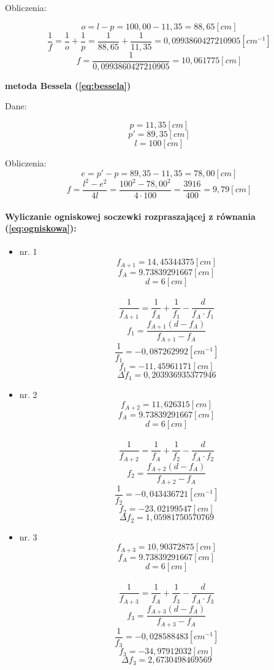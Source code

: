 \documentclass{article}
\begin{document}
Obliczenia:

\[o = l - p = 100,00 - 11,35 = 88,65[cm] \nonumber\]
\[\frac{1}{f} = \frac{1}{o}+\frac{1}{p} = \frac{1}{88,65} + \frac{1}{11,35} = 0,0993860427210905[cm^{-1}] \nonumber\]
\[f = \frac{1}{0,0993860427210905} = 10,061775 [cm] \nonumber\]

\textbf{metoda Bessela (\ref{eq:bessela})}

Dane: 

\[p = 11,35[cm]\nonumber\]
\[p' = 89,35[cm]\nonumber\]
\[l = 100[cm] \nonumber\]

Obliczenia: 
\[e = p' - p = 89,35 - 11,35 = 78,00[cm]\]
\[f = \frac{l^2-e^2}{4l} = \frac{100^2 - 78,00^2}{4 \cdot 100} = \frac{3916}{400} = 9,79[cm]\]

\paragraph{Wyliczanie ogniskowej soczewki rozpraszającej z równania (\ref{eq:ogniskowa}):}



\begin{itemize}
    \item nr. 1
        \[f_{A+1} = 14,45344375 [cm]\]
        \[f_A = 9.73839291667 [cm]\]
        \[d = 6 [cm]\] 
        \\
        \[\frac{1}{f_{A+1}} = \frac{1}{f_A} + \frac{1}{f_1} - \frac{d}{f_A \cdot f_1 }\]
        \[f_{1} = \frac{f_{A+1}(d-f_A)}{f_{A+1} - f_A}\]
        \[\frac{1}{f_1} = -0,087262992[cm^{-1}]\]
        \[f_1 = -11,45961171[cm]\]
        \[\Delta f_1 =  0,203936935377946\]

    \item nr. 2
        \[f_{A+2} = 11,626315 [cm]\]
        \[f_A = 9.73839291667 [cm]\]
        \[d = 6 [cm]\] 
        \\
        \[\frac{1}{f_{A+2}} = \frac{1}{f_A} + \frac{1}{f_2} - \frac{d}{f_A \cdot f_2 }\]
        \[f_{2} = \frac{f_{A+2}(d-f_A)}{f_{A+2} - f_A}\]
        \[\frac{1}{f_2} = -0,043436721 [cm^{-1}]\]
        \[f_2 = -23,02199547[cm]\]
        \[\Delta f_2 = 1,05981750570769\]
        
    \item nr. 3
        \[f_{A+3} = 10,90372875 [cm]\]
        \[f_A = 9.73839291667 [cm]\]
        \[d = 6 [cm]\] 
        \\
        \[\frac{1}{f_{A+3}} = \frac{1}{f_A} + \frac{1}{f_3} - \frac{d}{f_A \cdot f_3 }\]
        \[f_{3} = \frac{f_{A+3}(d-f_A)}{f_{A+3} - f_A}\]
        \[\frac{1}{f_3} =-0,028588483[cm^{-1}]\]
        \[f_3 = -34,97912032 [cm]\]
         \[\Delta f_3 = 2,6730498469569\]
\end{itemize}
\end{document}
